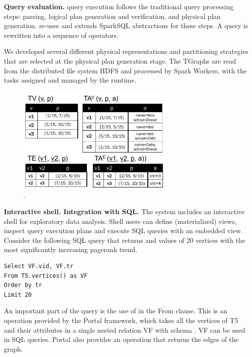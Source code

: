 {\bf Query evaluation.}  \ql query execution follows the traditional
query processing steps: parsing, logical plan generation and
verification, and physical plan generation. \ql re-uses and extends
SparkSQL abstractions for these steps.  A \ql query is rewritten into
a sequence of operators.

We developed several different physical representations and
partitioning strategies that are selected at the physical plan
generation stage. The TGraphs are read from the distributed file
system HDFS and processed by Spark Workers, with the tasks assigned
and managed by the runtime.

\begin{figure}[t]
\centering
\includegraphics[width=3in]{figs/T1_rel.pdf}
\vspace{-0.2cm}
\caption{\tg {}.}
\vspace{-0.4cm}
\label{fig:tg_rel}
\end{figure}

{\bf Interactive shell. Integration with SQL.}  The \ql system
includes an interactive shell for exploratory data analysis. Shell
users can define (materialized) views, inspect query execution plans
and execute SQL queries with an embedded \ql view. Consider the
following SQL query that returns  and  values of
20 vertices with the most significantly increasing pagerank trend.

\begin{small}
\begin{verbatim}
Select VF.vid, VF.tr
From T5.vertices() as VF
Order by tr
Limit 20
\end{verbatim}
\end{small}

An important part of the query is the use of  in
the From clause. This is an operation provided by the Portal
framework, which takes all the vertices of T5 and their attributes in
a single nested relation VF with schema . VF can be used in SQL queries. Portal also
provides an operation  that returns the edges of the
graph.



